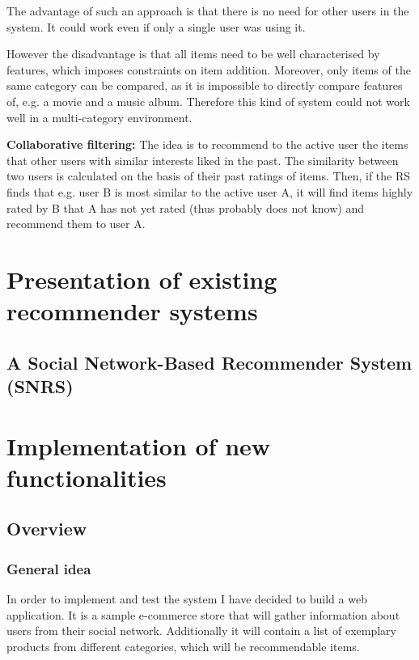\documentclass[12pt]{report}
\begin{document}
The advantage of such an approach is that there is no need for other users in the system. It could work even if only a single user was using it.

However the disadvantage is that all items need to be well characterised by features, which imposes constraints on item addition. Moreover, only items of the same category can be compared, as it is impossible to directly compare features of, e.g. a movie and a music album. Therefore this kind of system could not work well in a multi-category environment.

\hbox{}
{\bf Collaborative filtering:} The idea is to recommend to the active user the items that other users with similar interests liked in the past. The similarity between two users is calculated on the basis of their past ratings of items. Then, if the RS finds that e.g. user B is most similar to the active user A, it will find items highly rated by B that A has not yet rated (thus probably does not know) and recommend them to user A.





\chapter{Presentation of existing recommender systems}

\section{A Social Network-Based Recommender System (SNRS)}


\chapter{Implementation of new functionalities}

\section{Overview}
\subsection{General idea}
In order to implement and test the system I have decided to build a web application. It is a sample e-commerce store that will gather information about users from their social network. Additionally it will contain a list of exemplary products from different categories, which will be recommendable items. 
\end{document}
